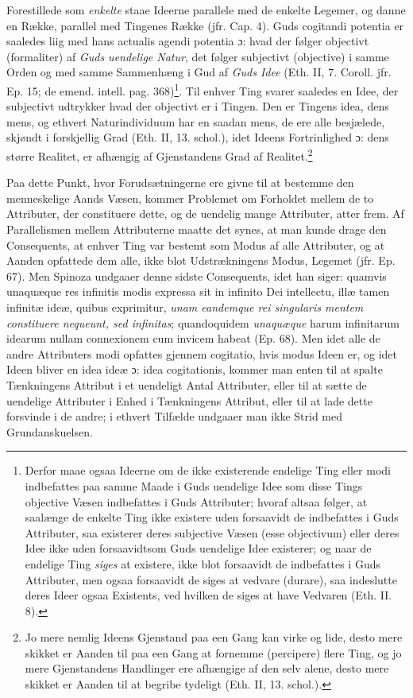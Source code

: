 \documentclass[12pt,a4paper]{book}
\newcommand{\opage}[1]{\marginnote{\footnotesize\textit{[#1]}}}
\begin{document}
Forestillede som \emph{enkelte} staae Ideerne parallele med de
enkelte Legemer, og danne en Række, parallel med Tingenes
Række (jfr. Cap. 4). Guds cogitandi potentia er saaledes liig
med hans actualis agendi potentia ɔ: hvad der følger objectivt
(formaliter) af \emph{Guds uendelige Natur}, det følger
subjectivt (objective) i samme Orden og med samme Sammenhæng
i Gud af \emph{Guds Idee} (Eth. II, 7. Coroll. jfr. Ep. 15; de
emend. intell. pag. 368)\footnote{Derfor maae ogsaa Ideerne om
de ikke existerende endelige Ting eller modi indbefattes paa
samme Maade i Guds uendelige Idee som disse Tings objective
Væsen indbefattes i Guds Attributer; hvoraf altsaa følger, at
saalænge de enkelte Ting ikke existere uden forsaavidt de
indbefattes i Guds Attributer, saa existerer deres subjective
Væsen (esse objectivum) eller deres Idee ikke uden
forsaavidtsom Guds uendelige Idee existerer; og naar de
endelige Ting \emph{siges} at existere, ikke blot forsaavidt de
indbefattes i Guds Attributer, men ogsaa forsaavidt de siges
at vedvare (durare), saa indeslutte deres Ideer ogsaa
Existents, ved hvilken de siges at have Vedvaren (Eth. II.
8).}. Til
\opage{85} \setcounter{footnote}{0}%
enhver Ting svarer saaledes en Idee, der subjectivt udtrykker
hvad der objectivt er i Tingen. Den er Tingens idea, dens
mens, og ethvert Naturindividuum har en saadan mens, de ere
alle besjælede, skjøndt i forskjellig Grad (Eth. II, 13.
schol.), idet Ideens Fortrinlighed ɔ: dens større Realitet, er
afhængig af Gjenstandens Grad af Realitet.\footnote{Jo mere
nemlig Ideens Gjenstand paa een Gang kan virke og lide, desto
mere skikket er Aanden til paa een Gang at fornemme
(percipere) flere Ting, og jo mere Gjenstandens Handlinger ere
afhængige af den selv alene, desto mere skikket er Aanden til
at begribe tydeligt (Eth. II, 13. schol.).}

Paa dette Punkt, hvor Forudsætningerne ere givne til at
bestemme den menneskelige Aands Væsen, kommer Problemet om
Forholdet mellem de to Attributer, der constituere dette, og
de uendelig mange Attributer, atter frem. Af Parallelismen
mellem Attributerne maatte det synes, at man kunde drage den
Consequents, at enhver Ting var bestemt som Modus af alle
Attributer, og at Aanden opfattede dem alle, ikke blot
Udstrækningens Modus, Legemet (jfr. Ep. 67). Men Spinoza
undgaaer denne sidste Consequents, idet han siger: quamvis
unaquæque res infinitis modis expressa sit in infinito Dei
intellectu, illæ tamen infinitæ ideæ, quibus exprimitur,
\emph{unam eandemque rei singularis mentem constituere
nequeunt, sed infinitas}; quandoquidem \emph{unaquæque} harum
infinitarum idearum nullam connexionem cum invicem habeat
(Ep. 68). Men idet alle de andre Attributers modi opfattes
gjennem cogitatio, hvis modus Ideen er, og idet Ideen bliver
en idea
\opage{86} \setcounter{footnote}{0}%
ideæ ɔ: idea cogitationis, kommer man enten til at spalte
Tænkningens Attribut i et uendeligt Antal Attributer, eller
til at sætte de uendelige Attributer i Enhed i Tænkningens
Attribut, eller til at lade dette forsvinde i de andre; i
ethvert Tilfælde undgaaer man ikke Strid med Grundanskuelsen.
\end{document}
